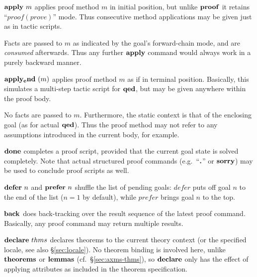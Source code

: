 \begin{descr}

\item [$\APPLY{m}$] applies proof method $m$ in initial position, but unlike
  ${\mathord{\mathbf{proof}}}$ it retains ``$proof(prove)$'' mode.  Thus consecutive method
  applications may be given just as in tactic scripts.
  
  Facts are passed to $m$ as indicated by the goal's forward-chain mode, and
  are \emph{consumed} afterwards.  Thus any further ${\mathord{\mathbf{apply}}}$ command would
  always work in a purely backward manner.
  
\item [${\mathord{\mathbf{apply_end}}}~(m)$] applies proof method $m$ as if in
  terminal position.  Basically, this simulates a multi-step tactic script for
  ${\mathord{\mathbf{qed}}}$, but may be given anywhere within the proof body.
  
  No facts are passed to $m$.  Furthermore, the static context is that of the
  enclosing goal (as for actual ${\mathord{\mathbf{qed}}}$).  Thus the proof method may not
  refer to any assumptions introduced in the current body, for example.
  
\item [${\mathord{\mathbf{done}}}$] completes a proof script, provided that the
  current goal state is solved completely.  Note that actual structured proof
  commands (e.g.\ ``$\textbf{.}$'' or ${\mathord{\mathbf{sorry}}}$) may be used to conclude proof
  scripts as well.

\item [${\mathord{\mathbf{defer}}}~n$ and ${\mathord{\mathbf{prefer}}}~n$] shuffle the list
  of pending goals: $defer$ puts off goal $n$ to the end of the list ($n = 1$
  by default), while $prefer$ brings goal $n$ to the top.
  
\item [${\mathord{\mathbf{back}}}$] does back-tracking over the result sequence of
  the latest proof command.  Basically, any proof command may return multiple
  results.
  
\item [${\mathord{\mathbf{declare}}}~thms$] declares theorems to the current theory
  context (or the specified locale, see also \S\ref{sec:locale}).  No theorem
  binding is involved here, unlike ${\mathord{\mathbf{theorems}}}$ or
  ${\mathord{\mathbf{lemmas}}}$ (cf.\ \S\ref{sec:axms-thms}), so
  ${\mathord{\mathbf{declare}}}$ only has the effect of applying attributes as
  included in the theorem specification.

\end{descr}

